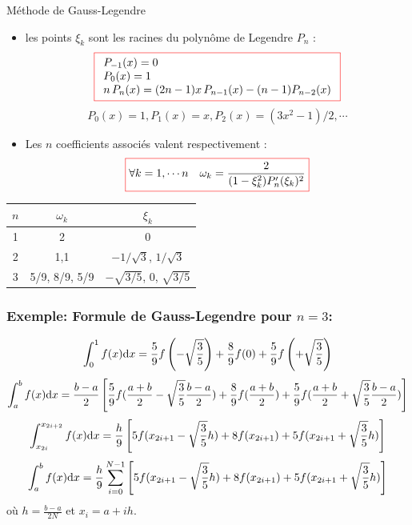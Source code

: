 \documentclass{beamer}
\def \de {{\rm d}}
\newcommand{\myredbox}[1]{\fcolorbox{red}{white}{$\displaystyle#1$}}
\begin{document}
\begin{frame}
\begin{block}{Méthode de Gauss-Legendre}
\begin{itemize}
\item les points $\xi_k$ sont les racines du polynôme de Legendre $P_n$ :
\[
\myredbox{
\begin{array}{l}
P_{-1}(x)=0 \\
P_0(x)=1\\
n\,P_n(x)=(2n-1)x\,P_{n-1}(x)-(n-1) P_{n-2}(x)
\end{array}
}\]
\[P_0(x)=1, P_1(x)=x, P_2(x)=(3x^2-1)/2, \cdots\]
\item Les $n$ coefficients associés valent respectivement :
\[\myredbox{\forall k =1,\cdots n\quad \omega_k=\frac{2}{(1-\xi_k^2)P'_n(\xi_k)^2}}\]
\end{itemize}
\begin{center}
\begin{tabular}{c|c|c}
$n$ & $\omega_k$ & $\xi_k$\\ \hline
1 & 2 & 0 \\ \hline
2 & 1,1 & $-1/\sqrt 3$, $1/\sqrt 3$\\ \hline
3& 5/9, 8/9, 5/9 & $-\sqrt{3/5}$, 0, $\sqrt{3/5}$
\end{tabular}
\end{center}
\end{block}
\end{frame}

\begin{frame}
\frametitle{Exemple: Formule de Gauss-Legendre pour $n=3$:}

\[ \int_0^1f(x)\de x = \frac 59f\left(-\sqrt{\frac 35}\right)+\frac 89 f(0)+\frac 59f\left(+\sqrt{\frac 35}\right)\]
\[ \int_a^bf(x)\de x = \frac{b-a}{2} \left[\frac 59f(\frac{a+b}2-\sqrt{\frac 35}\frac{b-a}2)+\frac 89 f(\frac{a+b}2)+\frac 59f(\frac{a+b}2+\sqrt{\frac 35}\frac{b-a}2)\right]\]
\[ \int_{x_{2i}}^{x_{2i+2}}f(x)\de x =\frac{h}{9} \left[5f(x_{2i+1}-\sqrt{\frac 35}h)+8f(x_{2i+1})+5f(x_{2i+1}+\sqrt{\frac 35}h)\right]\]
\[ \int_a^bf(x)\de x = \frac{h}{9} \sum_{i=0}^{N-1}\left[5f(x_{2i+1}-\sqrt{\frac 35}h)+8f(x_{2i+1})+5f(x_{2i+1}+\sqrt{\frac 35}h)\right]\]
où $h=\frac{b-a}{2N}$ et $x_i=a+ih$.
\end{frame}


\end{document}

